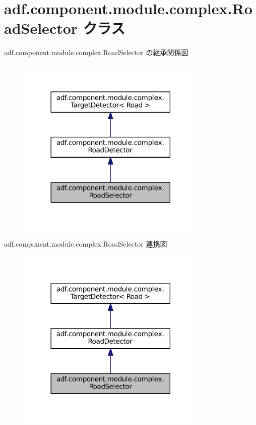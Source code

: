 \hypertarget{classadf_1_1component_1_1module_1_1complex_1_1RoadSelector}{}\section{adf.\+component.\+module.\+complex.\+Road\+Selector クラス}
\label{classadf_1_1component_1_1module_1_1complex_1_1RoadSelector}


adf.\+component.\+module.\+complex.\+Road\+Selector の継承関係図
\nopagebreak
\begin{figure}[H]
\begin{center}
\leavevmode
\includegraphics[width=257pt]{classadf_1_1component_1_1module_1_1complex_1_1RoadSelector__inherit__graph}
\end{center}
\end{figure}


adf.\+component.\+module.\+complex.\+Road\+Selector 連携図
\nopagebreak
\begin{figure}[H]
\begin{center}
\leavevmode
\includegraphics[width=257pt]{classadf_1_1component_1_1module_1_1complex_1_1RoadSelector__coll__graph}
\end{center}
\end{figure}
